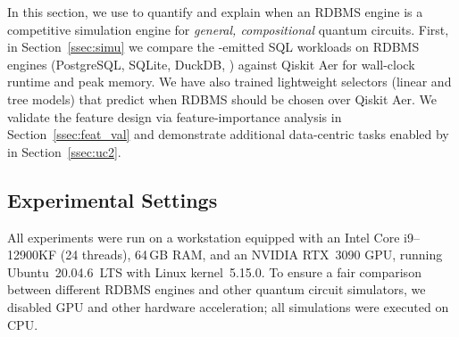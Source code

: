 In this section, we use \sys to quantify and explain when an RDBMS engine is a competitive simulation engine for \emph{general, compositional} quantum circuits. First, in Section~\ref{ssec:simu} we compare the \sys-emitted SQL workloads on  RDBMS engines (PostgreSQL, SQLite, DuckDB, ) against Qiskit Aer for wall-clock runtime and peak memory. We have also trained lightweight selectors (linear and tree models) that predict when RDBMS should be chosen over Qiskit Aer. We validate the feature design via feature-importance analysis in Section~\ref{ssec:feat_val} and demonstrate additional data-centric tasks enabled by \sys in Section~\ref{ssec:uc2}. 


\subsection{Experimental Settings}

All experiments were run on a  workstation equipped with an Intel Core
i9--12900KF (24 threads), 64\,GB RAM, and an NVIDIA RTX~3090 GPU, running
Ubuntu~20.04.6~LTS with Linux kernel~5.15.0. To ensure a fair comparison between
different RDBMS engines and other quantum circuit simulators, we disabled GPU and other
hardware acceleration; all simulations were executed on CPU.

